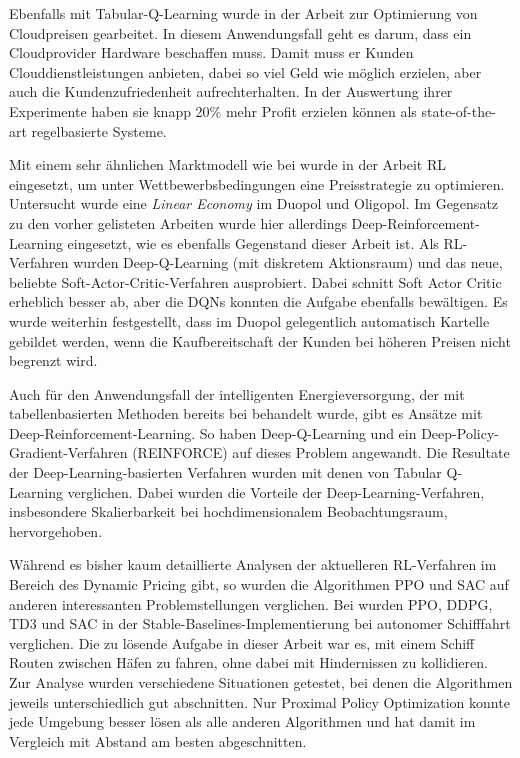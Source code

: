 Ebenfalls mit Tabular-Q-Learning wurde in der Arbeit \cite{9086147} zur Optimierung von Cloudpreisen gearbeitet.
In diesem Anwendungsfall geht es darum, dass ein Cloudprovider Hardware beschaffen muss.
Damit muss er Kunden Clouddienstleistungen anbieten, dabei so viel Geld wie möglich erzielen, aber auch die Kundenzufriedenheit aufrechterhalten.
In der Auswertung ihrer Experimente haben sie knapp 20\% mehr Profit erzielen können als state-of-the-art regelbasierte Systeme.

Mit einem sehr ähnlichen Marktmodell wie bei \cite{10.1145/3219819.3219833} wurde in der Arbeit \cite{Kastius2022} RL eingesetzt, um unter Wettbewerbsbedingungen eine Preisstrategie zu optimieren.
Untersucht wurde eine \textit{Linear Economy} im Duopol und Oligopol.
Im Gegensatz zu den vorher gelisteten Arbeiten wurde hier allerdings Deep-Reinforcement-Learning eingesetzt, wie es ebenfalls Gegenstand dieser Arbeit ist.
Als RL-Verfahren wurden Deep-Q-Learning (mit diskretem Aktionsraum) und das neue, beliebte Soft-Actor-Critic-Verfahren ausprobiert.
Dabei schnitt Soft Actor Critic erheblich besser ab, aber die DQNs konnten die Aufgabe ebenfalls bewältigen.
Es wurde weiterhin festgestellt, dass im Duopol gelegentlich automatisch Kartelle gebildet werden, wenn die Kaufbereitschaft der Kunden bei höheren Preisen nicht begrenzt wird.

Auch für den Anwendungsfall der intelligenten Energieversorgung, der mit tabellenbasierten Methoden bereits bei \cite{Kim2016DynamicPA} behandelt wurde, gibt es Ansätze mit Deep-Reinforcement-Learning.
So haben \cite{8356086} Deep-Q-Learning und ein Deep-Policy-Gradient-Verfahren (REINFORCE) auf dieses Problem angewandt.
Die Resultate der Deep-Learning-basierten Verfahren wurden mit denen von Tabular Q-Learning verglichen.
Dabei wurden die Vorteile der Deep-Learning-Verfahren, insbesondere Skalierbarkeit bei hochdimensionalem Beobachtungsraum, hervorgehoben.

Während es bisher kaum detaillierte Analysen der aktuelleren RL-Verfahren im Bereich des Dynamic Pricing gibt, so wurden die Algorithmen PPO und SAC auf anderen interessanten Problemstellungen verglichen.
Bei \cite{LarsenVessel} wurden PPO, DDPG, TD3 und SAC in der Stable-Baselines-Implementierung bei autonomer Schifffahrt verglichen.
Die zu lösende Aufgabe in dieser Arbeit war es, mit einem Schiff Routen zwischen Häfen zu fahren, ohne dabei mit Hindernissen zu kollidieren.
Zur Analyse wurden verschiedene Situationen getestet, bei denen die Algorithmen jeweils unterschiedlich gut abschnitten.
Nur Proximal Policy Optimization konnte jede Umgebung besser lösen als alle anderen Algorithmen und hat damit im Vergleich mit Abstand am besten abgeschnitten.

